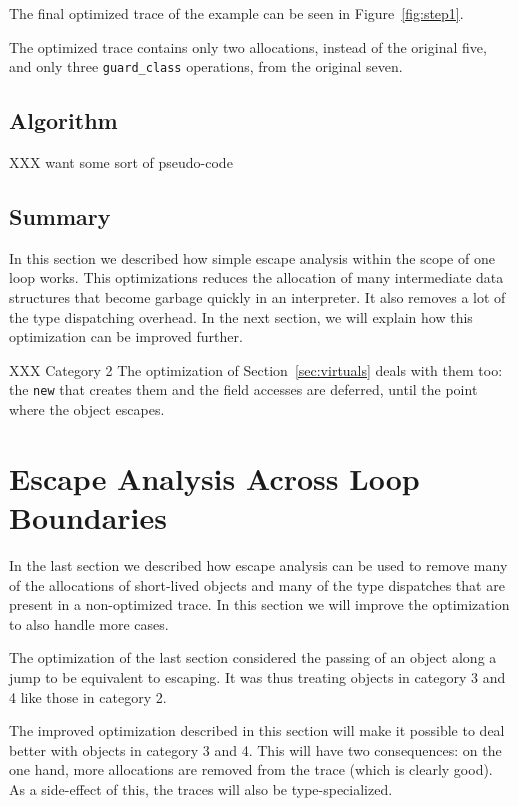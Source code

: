 \documentclass{sigplanconf}
\begin{document}
The final optimized trace of the example can be seen in
Figure~\ref{fig:step1}.

The optimized trace contains only two allocations, instead of the original five,
and only three \texttt{guard\_class} operations, from the original seven.

\subsection{Algorithm}
\label{sub:Algorithm}

XXX want some sort of pseudo-code



\subsection{Summary}

In this section we described how simple escape analysis within the scope of one
loop works. This optimizations reduces the allocation of many intermediate data
structures that become garbage quickly in an interpreter. It also removes a lot
of the type dispatching overhead. In the next section, we will explain how this
optimization can be improved further.

XXX Category 2 The optimization of
Section~\ref{sec:virtuals} deals with them too: the \texttt{new} that creates them and
the field accesses are deferred, until the point where the object escapes.


\section{Escape Analysis Across Loop Boundaries}
\label{sec:crossloop}

In the last section we described how escape analysis can be used to remove
many of the allocations of short-lived objects and many of the type dispatches
that are present in a non-optimized trace. In this section we will improve the
optimization to also handle more cases.

The optimization of the last section considered the passing of an object along a
jump to be equivalent to escaping. It was thus treating objects in category 3
and 4 like those in category 2.

The improved optimization described in this section will make it possible to deal
better with objects in category 3 and 4. This will have two consequences: on
the one hand, more allocations are removed from the trace (which is clearly
good). As a side-effect of this, the traces will also be type-specialized.
\end{document}

